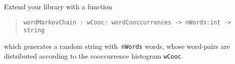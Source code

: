 \label{markov2}
Extend your library with a function
\begin{quote}
  \mbox{\lstinline!wordMarkovChain : wCooc: wordCooccurrences -> nWords:int -> string!}
\end{quote}
which generates a random string with\lstinline! nWords! words, whose
word-pairs are distributed according to the cooccurrence
histogram \lstinline!wCooc!.
